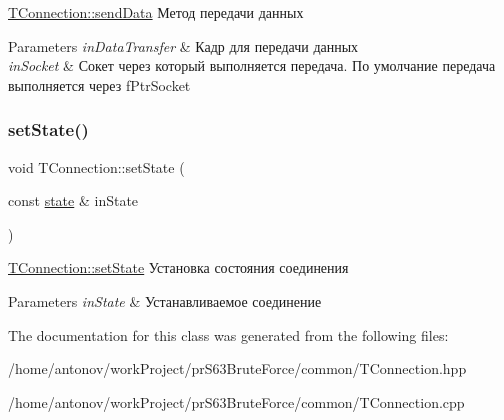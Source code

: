 \hyperlink{classconnection_1_1_t_connection_acf6af6c583b67379f8aa1efb4ab9e79e}{T\+Connection\+::send\+Data} Метод передачи данных 


\begin{DoxyParams}{Parameters}
{\em in\+Data\+Transfer} & Кадр для передачи данных \\
\hline
{\em in\+Socket} & Сокет через который выполняется передача. По умолчание передача выполняется через f\+Ptr\+Socket \\
\hline
\end{DoxyParams}
\mbox{\label{classconnection_1_1_t_connection_ad87c4791bb1a08d97e4d4ae0b85c5d44}} 
\subsubsection{\texorpdfstring{set\+State()}{setState()}}
{\footnotesize\ttfamily void T\+Connection\+::set\+State (\begin{DoxyParamCaption}\item[{const \hyperlink{classconnection_1_1_t_connection_aee7dfb7510592bd2697ab6f906b9612c}{state} \&}]{in\+State }\end{DoxyParamCaption})}



\hyperlink{classconnection_1_1_t_connection_ad87c4791bb1a08d97e4d4ae0b85c5d44}{T\+Connection\+::set\+State} Установка состояния соединения 


\begin{DoxyParams}{Parameters}
{\em in\+State} & Устанавливаемое соединение \\
\hline
\end{DoxyParams}


The documentation for this class was generated from the following files\+:\begin{DoxyCompactItemize}
\item 
/home/antonov/work\+Project/pr\+S63\+Brute\+Force/common/T\+Connection.\+hpp\item 
/home/antonov/work\+Project/pr\+S63\+Brute\+Force/common/T\+Connection.\+cpp\end{DoxyCompactItemize}
